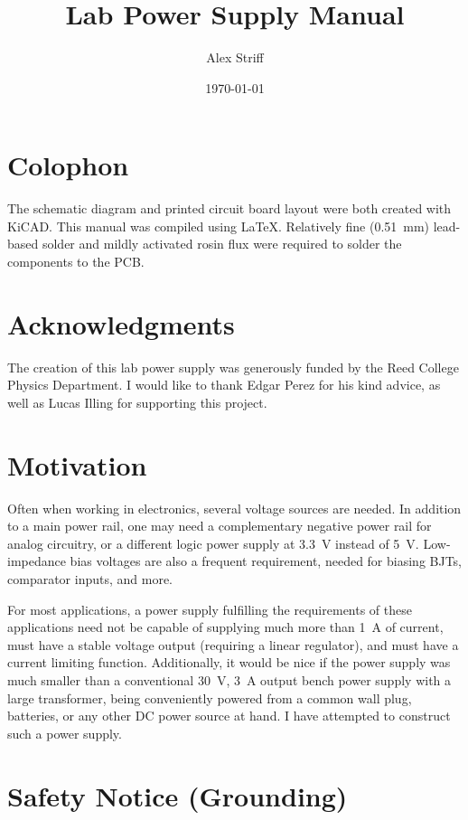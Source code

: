 \documentclass[letterpaper,twocolumn,10pt]{article}
\title{Lab Power Supply Manual}
\author{Alex Striff}
\date{\today}
\begin{document}
\maketitle
\tableofcontents
\listoftables
\thispagestyle{empty}

\section*{Colophon}

The schematic diagram and printed circuit board layout were both created with
KiCAD. This manual was compiled using \LaTeX. Relatively fine (\SI{0.51}{\mm})
lead-based solder and mildly activated rosin flux were required to solder the
components to the PCB.

\section{Acknowledgments}

The creation of this lab power supply was generously funded by the Reed College
Physics Department. I would like to thank Edgar Perez for his kind advice, as
well as Lucas Illing for supporting this project.

\section{Motivation}

Often when working in electronics, several voltage sources are needed. In
addition to a main power rail, one may need a complementary negative power rail
for analog circuitry, or a different logic power supply at \SI{3.3}{\V} instead
of \SI{5}{\V}. Low-impedance bias voltages are also a frequent requirement,
needed for biasing BJTs, comparator inputs, and more.

For most applications, a power supply fulfilling the requirements of these
applications need not be capable of supplying much more than \SI{1}{\A} of
current, must have a stable voltage output (requiring a linear regulator), and
must have a current limiting function.  Additionally, it would be nice if the
power supply was much smaller than a conventional \SI{30}{\V}, \SI{3}{\A} output
bench power supply with a large transformer, being conveniently powered from a
common wall plug, batteries, or any other DC power source at hand. I have
attempted to construct such a power supply.

\section{Safety Notice (Grounding)}
\end{document}
